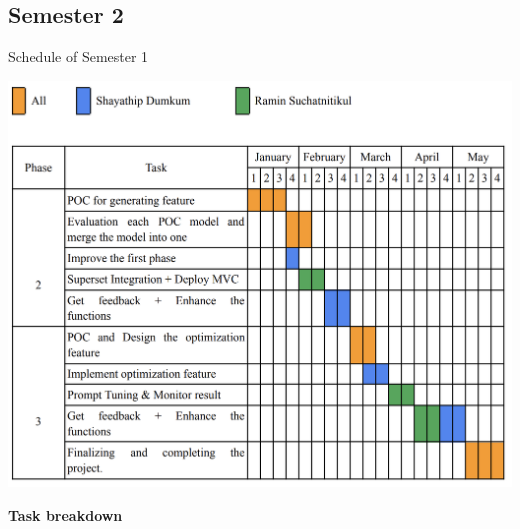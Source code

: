     \subsection{Semester 2}
    \begin{table}[H]
        \centering
        \caption{Schedule of Semester 1}\label{tbl:schedule2}
        \includegraphics[width=15cm]{chapters/1/figures/plan2.png}
    \end{table}
    \textbf{Task breakdown}
